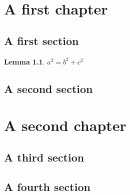 \documentclass{report}
\theoremstyle{plain}
\newtheorem{lemma}[subsection]{Lemma}
\theoremstyle{definition}
\theoremstyle{remark}
\numberwithin{equation}{subsection}
\begin{document}
\chapter{A first chapter}
\label{chapter:first}

\section{A first section}
\label{section:first}

\begin{lemma}
  \label{lemma:pythagoras}
  $a^2=b^2+c^2$
\end{lemma}

\section{A second section}
\label{section:second}


\chapter{A second chapter}
\label{chapter:second}

\section{A third section}
\label{section:third}

\section{A fourth section}
\label{section:fourth}
\end{document}
